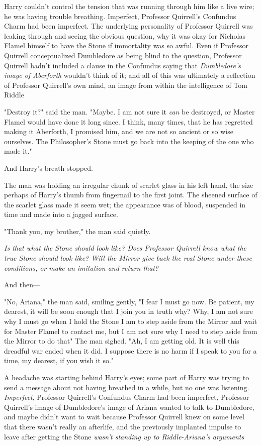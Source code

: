 Harry couldn't control the tension that was running through him like a live
wire; he was having trouble breathing. Imperfect, Professor Quirrell's
Confundus Charm had been imperfect. The underlying personality of Professor
Quirrell was leaking through and seeing the obvious question, why it was okay
for Nicholas Flamel himself to have the Stone if immortality was so awful. Even
if Professor Quirrell conceptualized Dumbledore as being blind to the question,
Professor Quirrell hadn't included a clause in the Confundus saying that
\emph{Dumbledore's image of Aberforth} wouldn't think of it; and all of this
was ultimately a reflection of Professor Quirrell's own mind, an image from
within the intelligence of Tom Riddle{\el}

"Destroy it?" said the man. "Maybe. I am not sure it \emph{can} be destroyed,
or Master Flamel would have done it long since. I think, many times, that he
has regretted making it{\el} Aberforth, I promised him, and we are not so
ancient or so wise ourselves. The Philosopher's Stone must go back into the
keeping of the one who made it."

And Harry's breath stopped.

The man was holding an irregular chunk of scarlet glass in his left hand, the
size perhaps of Harry's thumb from fingernail to the first joint. The sheened
surface of the scarlet glass made it seem wet; the appearance was of blood,
suspended in time and made into a jagged surface.

"Thank you, my brother," the man said quietly.

\emph{Is that what the Stone should look like? Does Professor Quirrell know
what the true Stone should look like? Will the Mirror give back the real Stone
under these conditions, or make an imitation and return that?}

And then—

"No, Ariana," the man said, smiling gently, "I fear I must go now. Be patient,
my dearest, it will be soon enough that I join you in truth{\el} why? Why, I
am not sure why I must go{\el} when I hold the Stone I am to step aside from
the Mirror and wait for Master Flamel to contact me, but I am not sure why I
need to step aside from the Mirror to do that{\el}" The man sighed. "Ah, I
am getting old. It is well this dreadful war ended when it did. I suppose there
is no harm if I speak to you for a time, my dearest, if you wish it so."

A headache was starting behind Harry's eyes; some part of Harry was trying to
send a message about not having breathed in a while, but no one was listening.
\emph{ Imperfect}, Professor Quirrell's Confundus Charm had been imperfect,
Professor Quirrell's image of Dumbledore's image of Ariana wanted to talk to
Dumbledore, and maybe didn't want to wait because Professor Quirrell knew on
some level that there wasn't really an afterlife, and the previously implanted
impulse to leave after getting the Stone \emph{wasn't standing up to
Riddle-Ariana's arguments{\el}}


